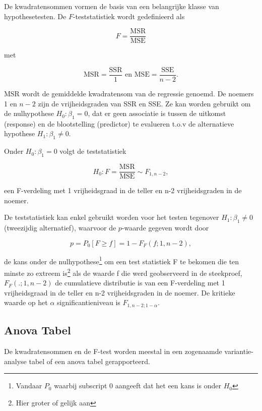 \documentclass[
  dutch,
  letterpaper,
  12pt]{book}
\theoremstyle{definition}
\theoremstyle{definition}
\theoremstyle{definition}
\theoremstyle{remark}
\begin{document}
De kwadratensommen vormen de basis van een belangrijke klasse van
hypothesetesten. De \(F\)-teststatistiek wordt gedefinieerd als

\[  F  = \frac{\text{MSR}}{\text{MSE}}\]

met

\[\text{MSR} = \frac{\text{SSR}}{1} \text{ en } \text{MSE} = \frac{\text{SSE}}{n-2}.\]

MSR wordt de gemiddelde kwadratensom van de regressie genoemd. De
noemers 1 en \(n-2\) zijn de vrijheidsgraden van SSR en SSE. Ze kan
worden gebruikt om de nulhypothese \(H_0: \beta_1=0\), dat er geen
associatie is tussen de uitkomst (response) en de blootstelling
(predictor) te evalueren t.o.v de alternatieve hypothese
\(H_1: \beta_1\neq0\).

Onder \(H_0: \beta_1=0\) volgt de teststatistiek

\[H_0:F = \frac{\text{MSR}}{\text{MSE}} \sim F_{1,n-2},\]

een F-verdeling met 1 vrijheidsgraad in de teller en n-2 vrijheidsgraden
in de noemer.

De teststatistiek kan enkel gebruikt worden voor het testen tegenover
\(H_1:\beta_1\neq 0\) (tweezijdig alternatief), waarvoor de \(p\)-waarde
gegeven wordt door

\[  p = P_0\left[F\geq f\right]=1-F_F(f;1,n-2),\]

de kans onder de nulhypothese\footnote{Vandaar \(P_0\) waarbij subscript
  0 aangeeft dat het een kans is onder \(H_0\)} om een test statistiek F
te bekomen die ten minste zo extreem is\footnote{Hier groter of gelijk
  aan} als de waarde f die werd geobserveerd in de steekproef,
\(F_F(.;1,n-2)\) de cumulatieve distributie is van een F-verdeling met 1
vrijheidsgraad in de teller en n-2 vrijheidsgraden in de noemer. De
kritieke waarde op het \(\alpha\) significantieniveau is
\(F_{1,n-2;1-\alpha}\).

\subsection{Anova Tabel}\label{anova-tabel}

De kwadratensommen en de F-test worden meestal in een zogenaamde
variantie-analyse tabel of een anova tabel gerapporteerd.
\end{document}
